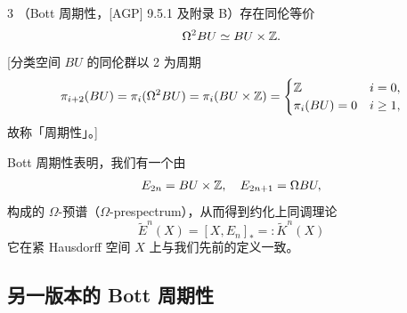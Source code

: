 
\begin{thm}{3}
  （Bott 周期性，[AGP] 9.5.1 及附录 B）存在同伦等价
  \[ \Omega^2 BU\simeq BU\times\mathbb{Z} . \]
  [分类空间 $BU$ 的同伦群以 2 为周期
  \[
  \pi_{i+2}(BU)=\pi_i(\Omega^2BU)=\pi_i(BU\times\mathbb{Z})=
  \begin{cases}
    \mathbb{Z} & i=0,\\
    \pi_i(BU)=0 & i\ge 1,
  \end{cases}
  \]
  故称「周期性」。]
\end{thm}

Bott 周期性表明，我们有一个由
\[ E_{2n}=BU\times\mathbb{Z},\quad E_{2n+1}=\Omega BU, \]
构成的 $\Omega$-预谱（$\Omega$-prespectrum），从而得到约化上同调理论
\[ \widetilde E^n(X)=[X,E_n]_*=:\widetilde K^n(X) \]
它在紧 Hausdorff 空间 $X$ 上与我们先前的定义一致。

\subsection{另一版本的 Bott 周期性}

